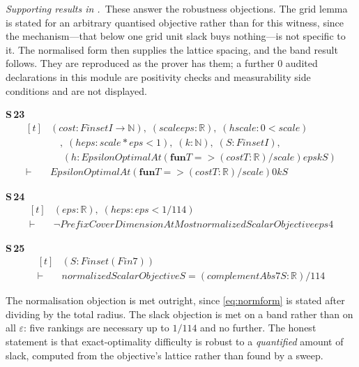 
\noindent\emph{Supporting results in .}~These answer the robustness objections. The grid lemma is stated for an arbitrary quantised objective rather than for this witness, since the mechanism---that below one grid unit slack buys nothing---is not specific to it. The normalised form then supplies the lattice spacing, and the band result follows. They are reproduced as the prover has them; a further $0$ audited declarations in this module are positivity checks and measurability side conditions and are not displayed.

\noindent\textbf{S\,23}\quad{}
{\footnotesize\[ \begin{aligned}[t]
&(\mathit{cost} : \mathit{Finset} \mathit{I} \to \mathbb{N} ),\; (\mathit{scale} \mathit{eps} : \mathbb{R} ),\; (\mathit{hscale} : 0 < \mathit{scale})\\
&\quad ,\; (\mathit{heps} : \mathit{scale} * \mathit{eps} < 1),\; (\mathit{k} : \mathbb{N} ),\; (\mathit{S} : \mathit{Finset} \mathit{I}),\\
&\quad \; (\mathit{h} : \mathit{EpsilonOptimalAt} (\mathbf{fun} \mathit{T} => (\mathit{cost} \mathit{T}:\mathbb{R} )/\mathit{scale}) \mathit{eps} \mathit{k} \mathit{S})\\
\vdash\;&\mathit{EpsilonOptimalAt} (\mathbf{fun} \mathit{T} => (\mathit{cost} \mathit{T}:\mathbb{R} )/\mathit{scale}) 0 \mathit{k} \mathit{S}
\end{aligned} \]}

\noindent\textbf{S\,24}\quad{}
{\footnotesize\[ \begin{aligned}[t]
&(\mathit{eps} : \mathbb{R} ),\; (\mathit{heps} : \mathit{eps} < 1/114)\\
\vdash\;&\neg \mathit{PrefixCoverDimensionAtMost} \mathit{normalizedScalarObjective} \mathit{eps} 4
\end{aligned} \]}

\noindent\textbf{S\,25}\quad{}
{\footnotesize\[ \begin{aligned}[t]
&(\mathit{S} : \mathit{Finset} (\mathit{Fin} 7))\\
\vdash\;&\mathit{normalizedScalarObjective} \mathit{S} = (\mathit{complementAbs7} \mathit{S}:\mathbb{R} )/114
\end{aligned} \]}


The normalisation objection is met outright, since \eqref{eq:normform} is stated after
dividing by the total radius. The slack objection is met on a band rather than on all
$\varepsilon$: five rankings are necessary up to $1/114$ and no further. The honest statement
is that exact-optimality difficulty is robust to a \emph{quantified} amount of slack,
computed from the objective's lattice rather than found by a sweep.

